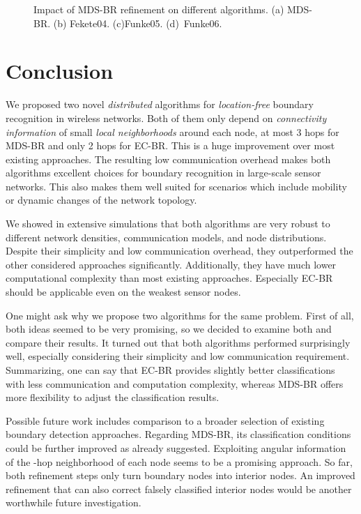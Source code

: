 \documentclass{llncs}
\begin{document}
\begin{figure}[p]
\centering
\hfill
{}
\hfill
{}
\hfill
{}
\hfill
{}
\hfill{}
\caption{Impact of MDS-BR refinement on different algorithms. (a) MDS-BR. (b) Fekete04. (c)Funke05. (d)~Funke06.}
\label{fig:refinements}
\end{figure}



\section{Conclusion}
We proposed two novel \emph{distributed} algorithms for \emph{location-free} boundary recognition in wireless networks.
Both of them only depend on \emph{connectivity information} of small \emph{local neighborhoods} around each node, at most 3 hops for MDS-BR and only 2 hops for EC-BR.
This is a huge improvement over most existing approaches.
The resulting low communication overhead makes both algorithms excellent choices for boundary recognition in large-scale sensor networks.
This also makes them well suited for scenarios which include mobility or dynamic changes of the network topology.

We showed in extensive simulations that both algorithms are very robust to different network densities, communication models, and node distributions.
Despite their simplicity and low communication overhead, they outperformed the other considered approaches significantly.
Additionally, they have much lower computational complexity than most existing approaches.
Especially EC-BR should be applicable even on the weakest sensor nodes.

One might ask why we propose two algorithms for the same problem.
First of all, both ideas seemed to be very promising, so we decided to examine both and compare their results.
It turned out that both algorithms performed surprisingly well, especially considering their simplicity and low communication requirement.
Summarizing, one can say that EC-BR provides slightly better classifications with less communication and computation complexity, whereas MDS-BR offers more flexibility to adjust the classification results.

Possible future work includes comparison to a broader selection of existing boundary detection approaches.
Regarding MDS-BR, its classification conditions could be further improved as already suggested.
Exploiting angular information of the -hop neighborhood of each node seems to be a promising approach.
So far, both refinement steps only turn boundary nodes into interior nodes.
An improved refinement that can also correct falsely classified interior nodes would be another worthwhile future investigation.
\end{document}
